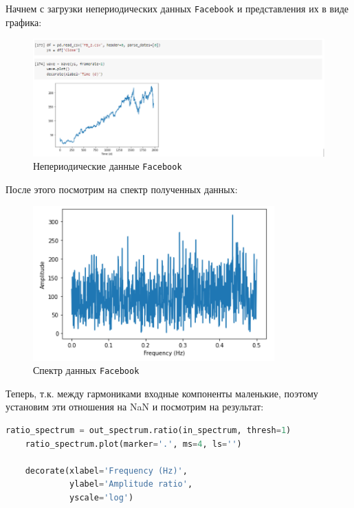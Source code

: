 \documentclass[a4paper]{article}
\begin{document}
            Начнем с загрузки непериодических данных \texttt{Facebook} и представления их в виде графика:
            
            \begin{figure}[H]
                \centering
                \includegraphics[width=\textwidth]{ex_1_new_wave.png}
                \caption{Непериодические данные \texttt{Facebook}}
                \label{fig:ex_1_new_wave}
            \end{figure}
            
            После этого посмотрим на спектр полученных данных:
            
            \begin{figure}[H]
                \centering
                \includegraphics{ex_1_new_spectr.png}
                \caption{Спектр данных \texttt{Facebook}}
                \label{fig:ex_1_new_spectr}
            \end{figure}
            
            Теперь, т.к. между гармониками входные компоненты маленькие, поэтому установим эти отношения на NaN и посмотрим на результат:
            
\begin{lstlisting}[language=Python, caption= \texttt{Ratio spectrum}]
    ratio_spectrum = out_spectrum.ratio(in_spectrum, thresh=1)
    ratio_spectrum.plot(marker='.', ms=4, ls='')
    
    decorate(xlabel='Frequency (Hz)',
             ylabel='Amplitude ratio',
             yscale='log')
\end{lstlisting}
            
\end{document}
